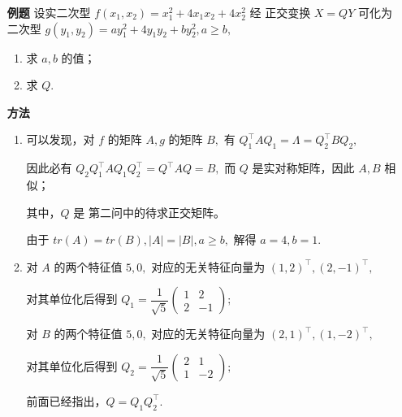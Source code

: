 \begin{itemize}
    \item[\textbf{例题}] 设实二次型 $ f(x_1,x_2) = x^2_1 + 4x_1x_2 + 4x_2^2 $ 经
    正交变换 $ X = QY $ 可化为二次型 $ g(y_1,y_2) = ay_1^2 + 4y_1y_2 + by_2^2, a \geq b, $ 
    \begin{enumerate}[label = \Roman*.]
        \item 求 $ a,b $ 的值；
        \item 求 $ Q. $ 
    \end{enumerate}
    \item[\textbf{方法}]
    \begin{enumerate}[label = \Roman*.]
        \item 可以发现，对 $ f $ 的矩阵 $ A, g $ 的矩阵 $ B, $ 有 
        $ Q^{\top}_1AQ_1 = \Lambda = Q^{\top}_2BQ_2, $ 
        
        因此必有 $ Q_2Q^{\top}_1AQ_1Q_2^\top = Q^\top AQ = B, $ 而
        $ Q $ 是实对称矩阵，因此 $ A,B $ 相似；
        
        其中，$ Q $ 是
        第二问中的待求正交矩阵。
        
        由于 $ tr(A) = tr(B), |A| = |B|, a \geq b, $ 
        解得 $ a = 4, b = 1. $
        \item 对 $ A $ 的两个特征值 $ 5, 0, $ 对应的无关特征向量为
        $ (1,2)^\top, (2,-1)^\top, $ 
        
        对其单位化后得到 
        $ Q_1 = \dfrac{1}{\sqrt 5}\begin{pmatrix}
            1&2\\2&-1
        \end{pmatrix}; $ 
        
        对 $ B $ 的两个特征值 $ 5, 0, $ 对应的无关特征向量为
        $ (2,1)^\top, (1,-2)^\top, $ 
        
        对其单位化后得到 
        $ Q_2 = \dfrac{1}{\sqrt 5}\begin{pmatrix}
            2&1\\1&-2
        \end{pmatrix}; $ 

        前面已经指出，$ Q = Q_1Q_2^\top. $ 
    \end{enumerate}
\end{itemize}

